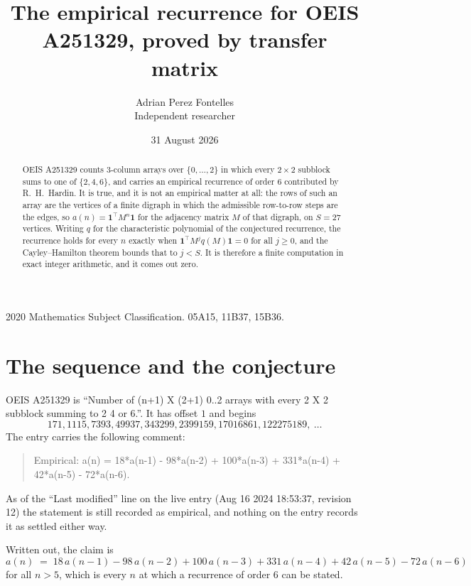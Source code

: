\documentclass[11pt,a4paper]{article}
\title{The empirical recurrence for OEIS A251329, proved by transfer matrix}
\author{Adrian Perez Fontelles\\ \small Independent researcher}
\date{31 August 2026}
\theoremstyle{plain}
\theoremstyle{definition}
\begin{document}
\maketitle

\begin{abstract}
OEIS A251329 counts $3$-column arrays over $\{0,\dots,2\}$ in which every
$2\times2$ subblock sums to one of $\{2, 4, 6\}$, and carries an empirical
recurrence of order $6$ contributed by R.~H.~Hardin. It is true, and it is not an
empirical matter at all: the rows of such an array are the vertices of a finite digraph in
which the admissible row-to-row steps are the edges, so $a(n)=\mathbf{1}^{\!\top}M^{n}
\mathbf{1}$ for the adjacency matrix $M$ of that digraph, on $S=27$ vertices. Writing
$q$ for the characteristic polynomial of the conjectured recurrence, the recurrence holds
for every $n$ exactly when $\mathbf{1}^{\!\top}M^{j}q(M)\mathbf{1}=0$ for all
$j\ge0$, and the Cayley--Hamilton theorem bounds that to $j<S$. It is therefore a finite
computation in exact integer arithmetic, and it comes out zero.
\end{abstract}

\noindent\small 2020 Mathematics Subject Classification. 05A15, 11B37, 15B36.\normalsize

\section{The sequence and the conjecture}

OEIS A251329 is ``Number of (n+1) X (2+1) 0..2 arrays with every 2 X 2 subblock summing to 2 4 or 6.''. It has offset $1$
and begins
\[
171, 1115, 7393, 49937, 343299, 2399159, 17016861, 122275189,\ \dots
\]
The entry carries the following comment:
\begin{quote}\small
Empirical: a(n) = 18*a(n-1) - 98*a(n-2) + 100*a(n-3) + 331*a(n-4) + 42*a(n-5) - 72*a(n-6).
\end{quote}
As of the ``Last modified'' line on the live entry (Aug 16 2024 18:53:37, revision 12) the statement is
still recorded as empirical, and nothing on the entry records it as settled either way.

Written out, the claim is
\begin{equation}\label{eq:conj}
a(n)\;=\;18\,a(n-1) - 98\,a(n-2) + 100\,a(n-3) + 331\,a(n-4) + 42\,a(n-5) - 72\,a(n-6)
\end{equation}
for all $n>5$, which is every $n$ at which a recurrence of order $6$ can be
stated.
\end{document}
